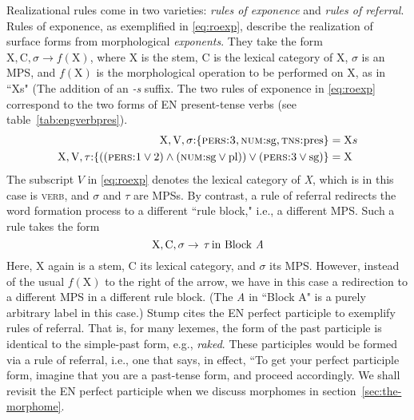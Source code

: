 Realizational rules come in two varieties:
\emph{rules of exponence} and \emph{rules of referral}. Rules of exponence, as exemplified in \eqref{eq:roexp}, describe the 
realization of surface forms from morphological \emph{exponents}. They take the form 
$\text{X},\text{C},\sigma \to f(\text{X})$, where X is the stem, C is the lexical category of X, 
$\sigma$ is an \ac{MPS},  and $f(\text{X})$ is the morphological operation to be performed 
on X, as in ``Xs" (The addition of an \emph{-s} suffix. The two rules of exponence in \eqref{eq:roexp}  
correspond to the two forms 
of \ac{EN} present-tense verbs (see table~\ref{tab:engverbpres}). 
\begin{align}
\label{eq:roexp}
	\text{X},\text{V},\sigma\text{:}\{ \textsc{pers:3}\text{,} \, \textsc{num:}\text{sg,} \, \textsc{tns:}\text{pres} \} &= \text{X}s \\ \label{eq:roexp1}
	\text{X},\text{V},\tau\text{:}\{((\textsc{pers:}\text{1}\vee\text{2}) \land (\textsc{num:}\text{sg}\vee\text{pl})) \vee (\textsc{pers:}3 \vee \text{sg})\} &= \text{X} 
\end{align}
The subscript $V$ in \eqref{eq:roexp} denotes the lexical category of \textit{X}, which is  
in this case is \textsc{verb}, 
and $\sigma$ and $\tau$ are \ac{MPS}s. 
By contrast, a rule of referral redirects the word formation process to a different ``rule block," i.e.,
a different \ac{MPS}. Such a rule takes the form 
\begin{equation}
\label{eq:ror}
\text{X}, \text{C}, \sigma \to \, \tau \, \text{in Block \textit{A}}
\end{equation}
Here, X again is a stem, 
C its lexical category, and $\sigma$ its MPS. However, instead of the usual $f(\text{X})$ 
to the right of the arrow, we have in this case a redirection to a 
different \ac{MPS} in a different rule block. (The \textit{A} in ``Block A" 
is a purely arbitrary label in this case.) Stump cites the \ac{EN} perfect participle 
to exemplify rules of referral. That is, for many lexemes, the form of the 
past participle is identical to the simple-past form, e.g., \textit{raked}. 
These participles would be formed via a rule of referral, i.e., one that 
says, in effect, ``To get your perfect participle form, imagine that you 
are a past-tense form, and proceed accordingly.  We shall revisit the \ac{EN} 
perfect participle when we discuss morphomes 
in section~\ref{sec:the-morphome}. 

%

